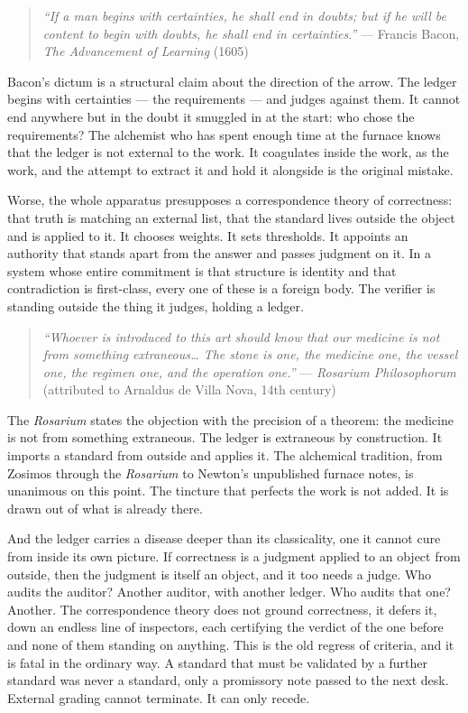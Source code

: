 \documentclass[12pt,a4paper]{article}
\begin{document}
\begin{quote}
\emph{``If a man begins with certainties, he shall end in doubts; but if
he will be content to begin with doubts, he shall end in certainties.''}
--- Francis Bacon, \emph{The Advancement of Learning} (1605)
\end{quote}

Bacon's dictum is a structural claim about the direction of the arrow.
The ledger begins with certainties --- the requirements --- and judges
against them. It cannot end anywhere but in the doubt it smuggled in at
the start: who chose the requirements? The alchemist who has spent
enough time at the furnace knows that the ledger is not external to the
work. It coagulates inside the work, as the work, and the attempt to
extract it and hold it alongside is the original mistake.

Worse, the whole apparatus presupposes a correspondence theory of
correctness: that truth is matching an external list, that the standard
lives outside the object and is applied to it. It chooses weights. It
sets thresholds. It appoints an authority that stands apart from the
answer and passes judgment on it. In a system whose entire commitment is
that structure is identity and that contradiction is first-class, every
one of these is a foreign body. The verifier is standing outside the
thing it judges, holding a ledger.

\begin{quote}
\emph{``Whoever is introduced to this art should know that our medicine
is not from something extraneous\ldots{} The stone is one, the medicine
one, the vessel one, the regimen one, and the operation one.''} ---
\emph{Rosarium Philosophorum} (attributed to Arnaldus de Villa Nova,
14th century)
\end{quote}

The \emph{Rosarium} states the objection with the precision of a
theorem: the medicine is not from something extraneous. The ledger is
extraneous by construction. It imports a standard from outside and
applies it. The alchemical tradition, from Zosimos through the
\emph{Rosarium} to Newton's unpublished furnace notes, is unanimous on
this point. The tincture that perfects the work is not added. It is
drawn out of what is already there.

And the ledger carries a disease deeper than its classicality, one it
cannot cure from inside its own picture. If correctness is a judgment
applied to an object from outside, then the judgment is itself an
object, and it too needs a judge. Who audits the auditor? Another
auditor, with another ledger. Who audits that one? Another. The
correspondence theory does not ground correctness, it defers it, down an
endless line of inspectors, each certifying the verdict of the one
before and none of them standing on anything. This is the old regress of
criteria, and it is fatal in the ordinary way. A standard that must be
validated by a further standard was never a standard, only a promissory
note passed to the next desk. External grading cannot terminate. It can
only recede.
\end{document}
